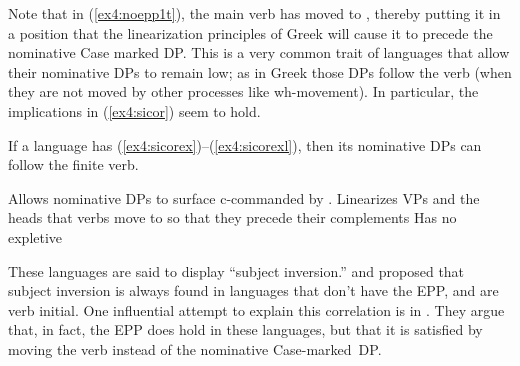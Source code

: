 Note that in (\ref{ex4:noepp1t}), the main verb has moved to , thereby putting it in a position that the linearization principles of Greek will cause it to precede the nominative Case marked DP. This is a very common trait of languages that allow their nominative DPs to remain low; as in Greek those DPs follow the verb (when they are not moved by other processes like wh-movement). In particular, the implications in (\ref{ex4:sicor}) seem to hold.
\begin{exe}
\ex \label{ex4:sicor} If a language has (\ref{ex4:sicorex})--(\ref{ex4:sicorexl}), then its nominative DPs can follow the finite verb.
\begin{xlist}
	\ex \label{ex4:sicorex} Allows nominative DPs to surface c-commanded by .
	\ex \label{ex4:sicorexl}Linearizes VPs and the heads that verbs move to so that they precede their complements
	\ex Has no expletive
\end{xlist}
\end{exe}
These languages are said to display ``subject inversion.'' \citet{Perlmutter:1971} and \citet{Rizzi:1982} proposed that subject inversion is always found in languages that don't have the EPP, and are verb initial. One influential attempt to explain this correlation is in \citet{Alexiadou:1998a,Alexiadou:1999a}. They argue that, in fact, the EPP does hold in these languages, but that it is satisfied by moving the verb instead of the nominative Case-marked~DP.

